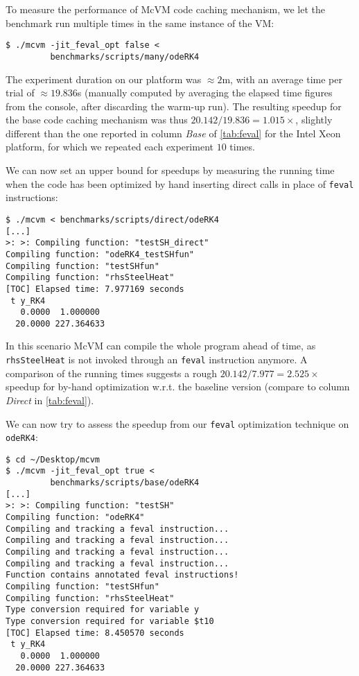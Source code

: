 \noindent To measure the performance of McVM code caching mechanism, we let the benchmark run multiple times in the same instance of the VM:

\begin{small}
\begin{verbatim}
$ ./mcvm -jit_feval_opt false <
         benchmarks/scripts/many/odeRK4
\end{verbatim}
\end{small}

\noindent The experiment duration on our platform was $\approx2$m, with an average time per trial of $\approx 19.836$s (manually computed by averaging the elapsed time figures from the console, after discarding the warm-up run). The resulting speedup for the base code caching mechanism was thus $20.142/19.836=1.015\times$, slightly different than the one reported in column {\em Base} of \mytable\ref{tab:feval} for the Intel Xeon platform, for which we repeated each experiment $10$ times.

We can now set an upper bound for speedups by measuring the running time when the code has been optimized by hand inserting direct calls in place of {\tt feval} instructions:

\begin{small}
\begin{verbatim}
$ ./mcvm < benchmarks/scripts/direct/odeRK4
[...]
>: >: Compiling function: "testSH_direct"
Compiling function: "odeRK4_testSHfun"
Compiling function: "testSHfun"
Compiling function: "rhsSteelHeat"
[TOC] Elapsed time: 7.977169 seconds
 t y_RK4
   0.0000  1.000000
  20.0000 227.364633
\end{verbatim}
\end{small}

\noindent In this scenario McVM can compile the whole program ahead of time, as {\tt rhsSteelHeat} is not invoked through an {\tt feval} instruction anymore. A comparison of the running times suggests a rough $20.142/7.977=2.525\times$ speedup for by-hand optimization w.r.t. the baseline version (compare to column {\em Direct} in \mytable\ref{tab:feval}).

We can now try to assess the speedup from our {\tt feval} optimization technique on {\tt odeRK4}:

\begin{small}
\begin{verbatim}
$ cd ~/Desktop/mcvm
$ ./mcvm -jit_feval_opt true <
         benchmarks/scripts/base/odeRK4
[...]
>: >: Compiling function: "testSH"
Compiling function: "odeRK4"
Compiling and tracking a feval instruction...
Compiling and tracking a feval instruction...
Compiling and tracking a feval instruction...
Compiling and tracking a feval instruction...
Function contains annotated feval instructions!
Compiling function: "testSHfun"
Compiling function: "rhsSteelHeat"
Type conversion required for variable y
Type conversion required for variable $t10
[TOC] Elapsed time: 8.450570 seconds
 t y_RK4
   0.0000  1.000000
  20.0000 227.364633
\end{verbatim}
\end{small}

